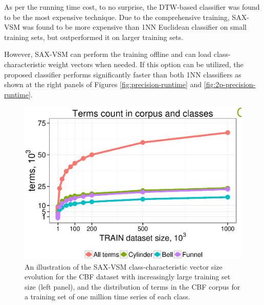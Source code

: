 As per the running time cost, to no surprise, the DTW-based classifier was found to be the most expensive technique. 
Due to the comprehensive training, SAX-VSM was found to be more expensive than 1NN Euclidean 
classifier on small training sets, but outperformed it on larger training sets.

However, SAX-VSM can perform the training offline and can load class-characteristic \tfidf weight vectors when needed. 
If this option can be utilized, the proposed classifier performs significantly faster than both 1NN classifiers as 
shown at the right panels of Figures \ref{fig:precision-runtime} and \ref{fig:2p-precision-runtime}.

\begin{figure}[t]
   \centering
   \includegraphics[width=140mm]{figures/words-cbf.ps}
   \caption{An illustration of the SAX-VSM class-characteristic vector size evolution for the CBF dataset 
   with increasingly large training set size (left panel), and the distribution of terms in the CBF corpus for 
   a training set of one million time series of each class.}
   \label{fig:venn-cbf}


\end{figure}
